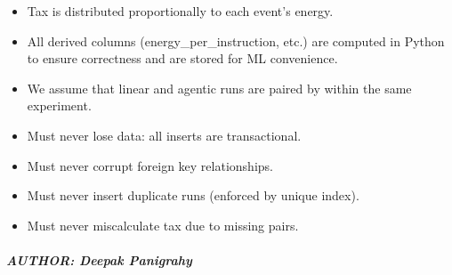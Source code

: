 \documentclass[letterpaper,10pt,english]{sphinxmanual}
\begin{document}
\begin{description}
\begin{itemize}
\item {} 
\sphinxAtStartPar
Tax is distributed proportionally to each event’s energy.

\item {} 
\sphinxAtStartPar
All derived columns (energy\_per\_instruction, etc.) are computed in Python
to ensure correctness and are stored for ML convenience.

\item {} 
\sphinxAtStartPar
We assume that linear and agentic runs are paired by  within
the same experiment.

\end{itemize}

\begin{itemize}
\item {} 
\sphinxAtStartPar
Must never lose data: all inserts are transactional.

\item {} 
\sphinxAtStartPar
Must never corrupt foreign key relationships.

\item {} 
\sphinxAtStartPar
Must never insert duplicate runs (enforced by unique index).

\item {} 
\sphinxAtStartPar
Must never miscalculate tax due to missing pairs.

\end{itemize}

\end{description}


\subparagraph{AUTHOR: Deepak Panigrahy}
\label{\detokenize{core.database.manager_oldversion:author-deepak-panigrahy}}
\end{document}
